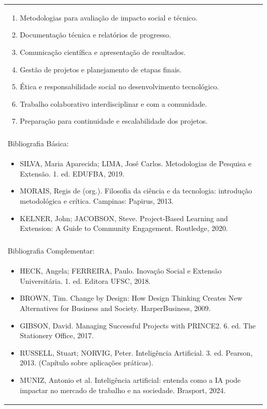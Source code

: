 \documentclass[11pt]{article}
\begin{document}
\begin{center}
\begin{longtable}{|p{4cm}|p{4cm}|p{4cm}|p{4cm}|}
{\begin{enumerate}
\item Metodologias para avaliação de impacto social e técnico.
\item Documentação técnica e relatórios de progresso.
\item Comunicação científica e apresentação de resultados.
\item Gestão de projetos e planejamento de etapas finais.
\item Ética e responsabilidade social no desenvolvimento tecnológico.
\item Trabalho colaborativo interdisciplinar e com a comunidade.
\item Preparação para continuidade e escalabilidade dos projetos.\end{enumerate}}\\
\multicolumn{4}{|p{16cm}|}{}\\
\hline
\multicolumn{4}{|p{16cm}|}{Bibliografia Básica:}\\
\multicolumn{4}{|p{16cm}|}{%
\begin{itemize}\item SILVA, Maria Aparecida; LIMA, José Carlos. Metodologias de Pesquisa e Extensão. 1. ed. EDUFBA, 2019.
\item MORAIS, Regis de (org.). Filosofia da ciência e da tecnologia: introdução metodológica e crítica. Campinas: Papirus, 2013.
\item KELNER, John; JACOBSON, Steve. Project-Based Learning and Extension: A Guide to Community Engagement. Routledge, 2020.\end{itemize}}\\
\multicolumn{4}{|p{16cm}|}{}\\
\hline
\multicolumn{4}{|p{16cm}|}{Bibliografia Complementar:}\\
\multicolumn{4}{|p{16cm}|}{%
\begin{itemize}\item HECK, Angela; FERREIRA, Paulo. Inovação Social e Extensão Universitária. 1. ed. Editora UFSC, 2018.
\item BROWN, Tim. Change by Design: How Design Thinking Creates New Alternatives for Business and Society. HarperBusiness, 2009.
\item GIBSON, David. Managing Successful Projects with PRINCE2. 6. ed. The Stationery Office, 2017.
\item RUSSELL, Stuart; NORVIG, Peter. Inteligência Artificial. 3. ed. Pearson, 2013. (Capítulo sobre aplicações práticas).
\item MUNIZ, Antonio et al. Inteligência artificial: entenda como a IA pode impactar no mercado de trabalho e na sociedade. Brasport, 2024.\end{itemize}}\\
\hline
\end{longtable}
\end{center}
\end{document}
